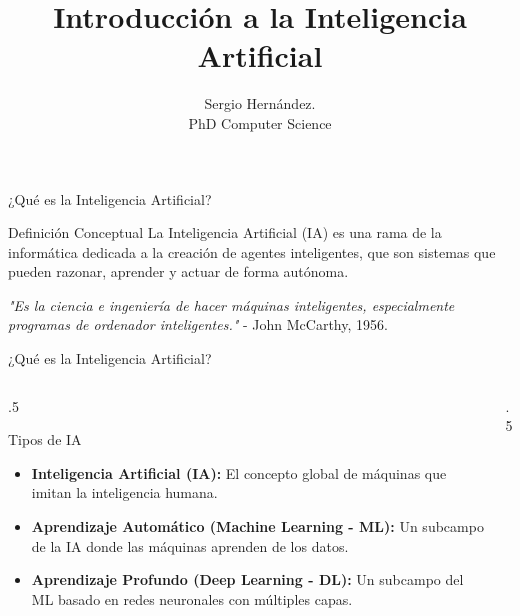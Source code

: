 \documentclass{beamer}
\title{Introducción a la Inteligencia Artificial}
\author{Sergio Hernández.\\ PhD Computer Science}
\institute{Magister en Data Science. Universidad Católica del Maule}
\begin{document}
\begin{frame}
  \titlepage
\end{frame}

\begin{frame}{¿Qué es la Inteligencia Artificial?}
  \begin{block}{Definición Conceptual}
    La Inteligencia Artificial (IA) es una rama de la informática dedicada a la creación de agentes inteligentes, que son sistemas que pueden razonar, aprender y actuar de forma autónoma.
    \vspace{0.5cm}
    
    \textit{"Es la ciencia e ingeniería de hacer máquinas inteligentes, especialmente programas de ordenador inteligentes."} - John McCarthy, 1956.
  \end{block}
  

\end{frame}

\begin{frame}{¿Qué es la Inteligencia Artificial?}
\begin{columns}[T]
   \begin{column}{.5\textwidth}
        \begin{block}{Tipos de IA}
          \begin{itemize}
      \item \textbf{Inteligencia Artificial (IA):} El concepto global de máquinas que imitan la inteligencia humana.
      \item \textbf{Aprendizaje Automático (Machine Learning - ML):} Un subcampo de la IA donde las máquinas aprenden de los datos.
      \item \textbf{Aprendizaje Profundo (Deep Learning - DL):} Un subcampo del ML basado en redes neuronales con múltiples capas.
  \end{itemize}
        \end{block}
    \end{column}
    \begin{column}{.5\textwidth}
    \end{column}
  \end{columns}

  

\end{frame}
\end{document}
